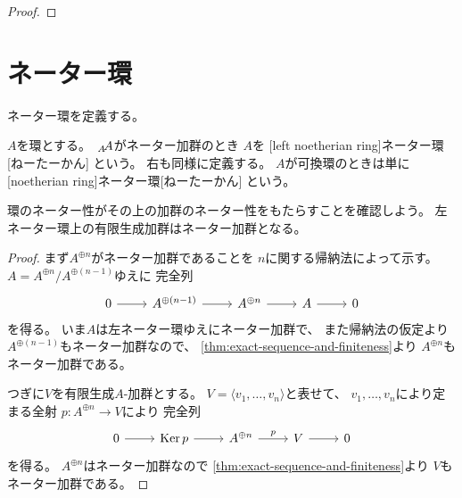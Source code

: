 \documentclass[report]{jlreq}
\begin{document}
\begin{proof}
    \TODO{}
\end{proof}



%
\section{ネーター環}

ネーター環を定義する。


\begin{definition}[ネーター環]
    $A$を環とする。
    $\,{}_{A}\!A$がネーター加群のとき
    $A$を
    [left noetherian ring]{ネーター環}[ねーたーかん]
    という。
    右も同様に定義する。
    $A$が可換環のときは単に
    [noetherian ring]{ネーター環}[ねーたーかん]
    という。
\end{definition}

環のネーター性がその上の加群のネーター性をもたらすことを確認しよう。
左ネーター環上の有限生成加群はネーター加群となる。


\begin{proof}
    まず$A^{\oplus n}$がネーター加群であることを
    $n$に関する帰納法によって示す。
    $A = A^{\oplus n} / A^{\oplus (n - 1)}$ゆえに
    完全列
    \begin{equation}
        \begin{tikzcd}
            0
                \ar{r}
                & A^{\oplus (n - 1)}
                    \ar{r}
                & A^{\oplus n}
                    \ar{r}
                & A
                    \ar{r}
                & 0
        \end{tikzcd}
    \end{equation}
    を得る。
    いま$A$は左ネーター環ゆえにネーター加群で、
    また帰納法の仮定より$A^{\oplus (n - 1)}$もネーター加群なので、
    \cref{thm:exact-sequence-and-finiteness}より
    $A^{\oplus n}$もネーター加群である。

    つぎに$V$を有限生成$A$-加群とする。
    $V = \langle v_1, \dots, v_n \rangle$と表せて、
    $v_1, \dots, v_n$により定まる全射
    $p \colon A^{\oplus n} \to V$により
    完全列
    \begin{equation}
        \begin{tikzcd}
            0
                \ar{r}
                & \Ker p
                    \ar{r}
                & A^{\oplus n}
                    \ar{r}{p}
                & V
                    \ar{r}
                & 0
        \end{tikzcd}
    \end{equation}
    を得る。
    $A^{\oplus n}$はネーター加群なので
    \cref{thm:exact-sequence-and-finiteness}より
    $V$もネーター加群である。
\end{proof}
\end{document}
